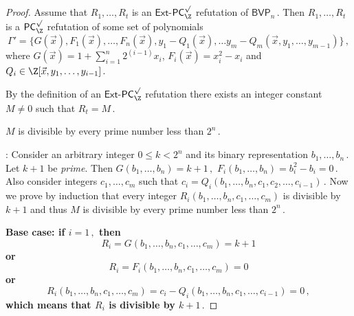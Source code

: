 \documentclass{toc}
\begin{document}
\begin{proof}


Assume that %
$R_1, \ldots, R_t$ %
 is an $\mathsf{Ext}$-$\mathsf{PC}^{\surd}_{\Z}$ refutation of %
$\mathsf{BVP}_n\,.$ %
 Then %
$R_1, \ldots, R_t$ %
 is a $\mathsf{PC}_{\Z}^{\surd}$ refutation of some set of polynomials
$$
%
\Gamma' = \{G(\vec x), F_1(\vec x), \ldots, F_n(\vec x), y_1 - Q_1(\vec x), \ldots y_m - Q_m(\vec x, y_1, \ldots, y_{m - 1})\}\,, %
$$
where
%
 $G(\vec x) = 1 + \sum_{i = 1}^n    %
 2^{(i - 1)} x_i$, $F_i(\vec x) = x_i^2 - x_i$ and %
$Q_i \in \Z[\vec x, y_1, \ldots, y_{i - 1}]\,.$ %

By the definition of an $\mathsf{Ext}$-$\mathsf{PC}^{\surd}_{\Z}$ refutation there exists an integer constant $M \neq 0$ such that %
$R_t = M\,.$ %

\begin{claim}\label{cla:M-div-every-prime}
$M$ is divisible by every prime number less than %
$2^n\,.$ %
\end{claim}
\par{}:
Consider an arbitrary integer %
%
$0 \le k < 2^n$ and its binary representation %
$b_{1}, \ldots, b_{n}\,.$ %
 Let $k + 1$ be \emph{prime}. Then %
$G(b_1, \ldots, b_n) = k + 1\,,$ %
$F_i(b_1, \ldots, b_n) = b_i^2 - b_i = 0\,.$ %
 Also consider integers $c_1, \ldots, c_m$ such that %
$c_i = Q_i(b_1, \ldots, b_n, c_1, c_2, \ldots, c_{i - 1})\,.$ %
 Now we prove by induction that every integer %
$R_i(b_1, \ldots, b_n, c_1, \ldots, c_m)$ is divisible by $k + 1$ and thus $M$ is divisible by every prime number less than %
$2^n\,.$ %

\bfseries Base case: \mdseries if %
$i = 1\,,$ %
 then
$$
R_i = G(b_1, \ldots, b_n, c_1, \ldots, c_m) = k + 1
$$ or 
$$
R_i = F_i(b_1, \ldots, b_n, c_1, \ldots, c_m) = 0
$$ or 
$$
%
R_i(b_1, \ldots, b_n, c_1, \ldots, c_m) = c_i - Q_i(b_1, \ldots, b_n, c_1, \ldots, c_{i - 1}) = 0\,, %
$$
which means that $R_i$ is divisible by %
$k + 1\,.$ %


\end{proof}
\end{document}
